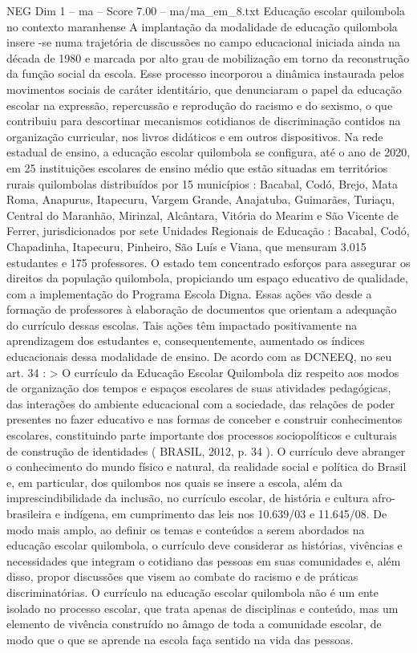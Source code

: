 \begin{textsample}{NEG Dim 1 – ma – Score 7.00 – ma/ma\_em\_8.txt}  \label{ex:f1_neg_229}
Educação escolar quilombola no contexto maranhense A implantação da modalidade de educação quilombola insere -se numa trajetória de discussões no campo educacional iniciada ainda na década de 1980 e marcada por alto grau de mobilização em torno da reconstrução da função social da escola.
Esse processo incorporou a dinâmica instaurada pelos movimentos sociais de caráter identitário, que denunciaram o papel da educação escolar na expressão, repercussão e reprodução do racismo e do sexismo, o que contribuiu para descortinar mecanismos cotidianos de discriminação contidos na organização curricular, nos livros didáticos e em outros dispositivos.
Na rede estadual de ensino, a educação escolar quilombola se configura, até o ano de 2020, em 25 instituições escolares de ensino médio que estão situadas em territórios rurais quilombolas distribuídos por 15 municípios : Bacabal, Codó, Brejo, Mata Roma, Anapurus, Itapecuru, Vargem Grande, Anajatuba, Guimarães, Turiaçu, Central do Maranhão, Mirinzal, Alcântara, Vitória do Mearim e São Vicente de Ferrer, jurisdicionados por sete Unidades Regionais de Educação : Bacabal, Codó, Chapadinha, Itapecuru, Pinheiro, São Luís e Viana, que mensuram 3.015 estudantes e 175 professores.
O estado tem concentrado esforços para assegurar os direitos da população quilombola, propiciando um espaço educativo de qualidade, com a implementação do Programa Escola Digna.
Essas ações vão desde a formação de professores à elaboração de documentos que orientam a adequação do currículo dessas escolas.
Tais ações têm impactado positivamente na aprendizagem dos estudantes e, consequentemente, aumentado os índices educacionais dessa modalidade de ensino.
De acordo com as DCNEEQ, no seu art. 34 : > O currículo da Educação Escolar Quilombola diz respeito aos modos de organização dos tempos e espaços escolares de suas atividades pedagógicas, das interações do ambiente educacional com a sociedade, das relações de poder presentes no fazer educativo e nas formas de conceber e construir conhecimentos escolares, constituindo parte importante dos processos sociopolíticos e culturais de construção de identidades ( BRASIL, 2012, p. 34 ).
O currículo deve abranger o conhecimento do mundo físico e natural, da realidade social e política do Brasil e, em particular, dos quilombos nos quais se insere a escola, além da imprescindibilidade da inclusão, no currículo escolar, de história e cultura afro-brasileira e indígena, em cumprimento das leis nos 10.639/03 e 11.645/08.
De modo mais amplo, ao definir os temas e conteúdos a serem abordados na educação escolar quilombola, o currículo deve considerar as histórias, vivências e necessidades que integram o cotidiano das pessoas em suas comunidades e, além disso, propor discussões que visem ao combate do racismo e de práticas discriminatórias.
O currículo na educação escolar quilombola não é um ente isolado no processo escolar, que trata apenas de disciplinas e conteúdo, mas um elemento de vivência construído no âmago de toda a comunidade escolar, de modo que o que se aprende na escola faça sentido na vida das pessoas.

\end{textsample}
